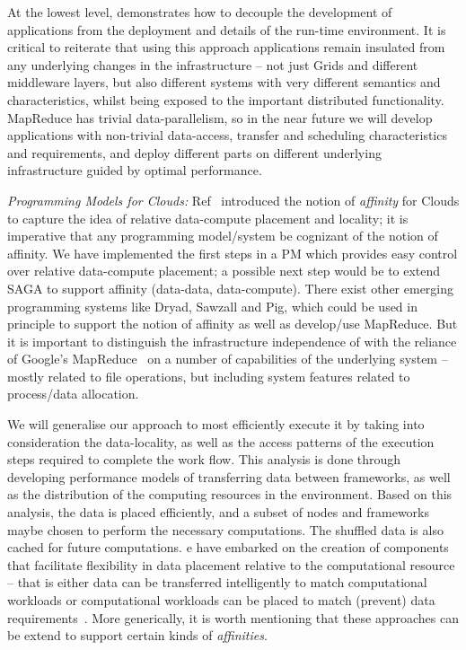 \documentclass[3p,twocolumn]{elsarticle}
\begin{document}


At the lowest level, \sagamapreduce demonstrates how to decouple the
development of applications from the deployment and details of the
run-time environment.  It is critical to reiterate that using this
approach applications remain insulated from any underlying changes in
the infrastructure -- not just Grids and different middleware layers,
but also different systems with very different semantics and
characteristics, whilst being exposed to the important distributed
functionality.  MapReduce has trivial data-parallelism, so in the near
future we will develop applications with non-trivial data-access,
transfer and scheduling characteristics and requirements, and deploy
different parts on different underlying infrastructure guided by
optimal performance.

{\it Programming Models for Clouds: } Ref~\cite{jha_ccpe09} introduced
the notion of {\it affinity} for Clouds to capture the idea of
relative data-compute placement and locality; it is imperative that
any programming model/system be cognizant of the notion of
affinity. We have implemented the first steps in a PM which provides
easy control over relative data-compute placement; a possible next
step would be to extend SAGA to support affinity (data-data,
data-compute).  There exist other emerging programming systems like
Dryad, Sawzall and Pig, which could be used in principle to support
the notion of affinity as well as develop/use MapReduce.  But it is
important to distinguish the infrastructure independence of
\sagamapreduce with the reliance of Google's
MapReduce~\cite{mapreduce-paper} on a number of capabilities of the
underlying system -- mostly related to file operations, but including
system features related to process/data allocation.

We will generalise our approach to most efficiently execute it by
taking into consideration the data-locality, as well as the access
patterns of the execution steps required to complete the work
flow. This analysis is done through developing performance models of
transferring data between frameworks, as well as the distribution of
the computing resources in the environment. Based on this analysis,
the data is placed efficiently, and a subset of nodes and frameworks
maybe chosen to perform the necessary computations. The shuffled data
is also cached for future computations.  e have embarked on the
creation of components that facilitate flexibility in data placement
relative to the computational resource -- that is either data can be
transferred intelligently to match computational workloads or
computational workloads can be placed to match (prevent) data
requirements~\cite{}. More generically, it is worth mentioning that
these approaches can be extend to support certain kinds of {\it
  affinities}.
\end{document}
